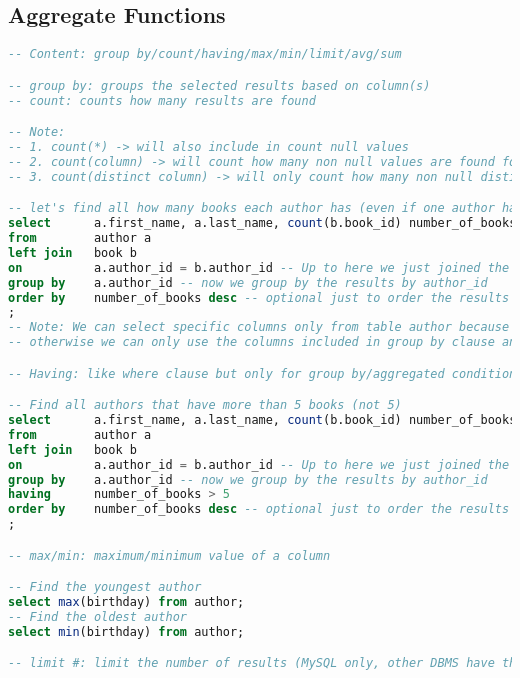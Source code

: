 \subsection{Aggregate Functions}
\begin{lstlisting}[language=SQL]
-- Content: group by/count/having/max/min/limit/avg/sum

-- group by: groups the selected results based on column(s)
-- count: counts how many results are found

-- Note:
-- 1. count(*) -> will also include in count null values
-- 2. count(column) -> will count how many non null values are found for that column
-- 3. count(distinct column) -> will only count how many non null distinct values that column has

-- let's find all how many books each author has (even if one author has no books)
select		a.first_name, a.last_name, count(b.book_id) number_of_books -- print only first, last name and number of books
from		author a
left join	book b
on			a.author_id = b.author_id -- Up to here we just joined the all authors with their books
group by	a.author_id -- now we group by the results by author_id
order by	number_of_books desc -- optional just to order the results based on the number of books
;
-- Note: We can select specific columns only from table author because in group by we used the primary key author_id from that table
-- otherwise we can only use the columns included in group by clause and the results of aggregate functions

-- Having: like where clause but only for group by/aggregated conditions

-- Find all authors that have more than 5 books (not 5)
select		a.first_name, a.last_name, count(b.book_id) number_of_books -- print only first, last name and number of books
from		author a
left join	book b
on			a.author_id = b.author_id -- Up to here we just joined the all authors with their books
group by	a.author_id -- now we group by the results by author_id
having		number_of_books > 5
order by	number_of_books desc -- optional just to order the results based on the number of books
;

-- max/min: maximum/minimum value of a column

-- Find the youngest author
select max(birthday) from author;
-- Find the oldest author
select min(birthday) from author;

-- limit #: limit the number of results (MySQL only, other DBMS have their own way of achieving this)


\end{lstlisting}
